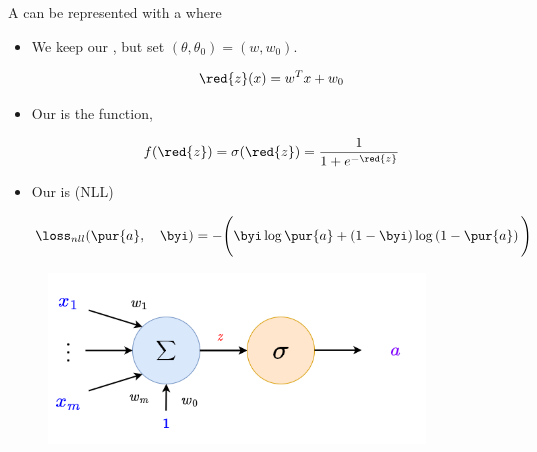         \begin{concept}
            A  can be represented with a  where
            
            \begin{itemize}
                \item We keep our , but set $(\theta, \theta_0) = (w, w_0)$.
                
                \begin{equation*}
                    \red{z}(x) = w^Tx+w_0
                \end{equation*}
                
                \item Our  is the  function, 
                
                \begin{equation*}
                    f(\red{z}) = \sigma(\red{z}) = \frac{1}{1+e^{-\red{z}}}
                \end{equation*}
                
                \item Our  is  (NLL)
                
                \begin{equation*}
                    \loss_{nll}
                    (\pur{a} ,\quad \byi)
                    =
                    -
                    \Bigg(
                        \byi \log{\pur{a}}
                        +
                        \left( 1 - \byi \right)
                        \log
                        \left( 1-\pur{a} \right) 
                    \Bigg)
                \end{equation*}
            
            \end{itemize}
        \end{concept}
        
        \begin{figure}[H]
            \centering
            \includegraphics[width=100mm,scale=0.4]{images/nn_images/llc_unit.png}
        \end{figure}
        